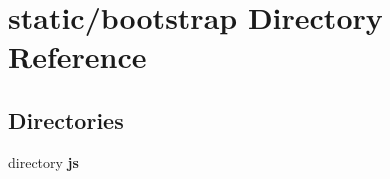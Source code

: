 \section{static/bootstrap Directory Reference}
\label{dir_26000722c585af2853eb3c64a2ffba95}
\subsection*{Directories}
\begin{DoxyCompactItemize}
\item 
directory {\bf js}
\end{DoxyCompactItemize}
